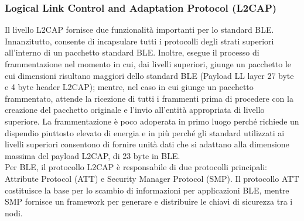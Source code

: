 \subsubsection{Logical Link Control and Adaptation Protocol (L2CAP)}
Il livello L2CAP fornisce due funzionalità importanti per lo standard BLE. Innanzitutto, consente di incapsulare tutti i protocolli degli strati superiori all'interno di un pacchetto standard BLE. Inoltre, esegue il processo di frammentazione nel momento in cui, dai livelli superiori, giunge un pacchetto le cui dimensioni risultano maggiori dello standard BLE (Payload LL layer 27 byte e 4 byte header L2CAP); mentre, nel caso in cui giunge un pacchetto frammentato, attende la ricezione di tutti i frammenti prima di procedere con la creazione del pacchetto originale e l'invio all'entità appropriata di livello superiore. La frammentazione è poco adoperata in primo luogo perché richiede un dispendio piuttosto elevato di energia e in più perché gli standard utilizzati ai livelli superiori consentono di fornire unità dati che si adattano alla dimensione massima del payload L2CAP, di 23 byte in BLE. \\
Per BLE, il protocollo L2CAP è responsabile di due protocolli principali: Attribute Protocol (ATT) e Security Manager Protocol (SMP). Il protocollo ATT costituisce la base per lo scambio di informazioni per applicazioni BLE, mentre SMP fornisce un framework per generare e distribuire le chiavi di sicurezza tra i nodi.


